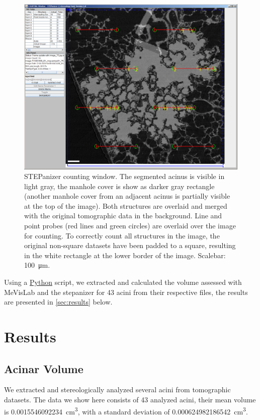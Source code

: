 \documentclass[twoside,paper=a4,abstract=true,english,DIVcalc]{scrartcl}
\newcommand{\imsize}{\linewidth}
\newcommand{\numberofacini}{43}
\newcommand{\volume}{0.0015546092234} %
\newcommand{\std}{0.000624982186542} %
\begin{document}
\renewcommand{\imsize}{\linewidth}%
\begin{figure}
	\centering
	\includegraphics[width=\imsize]{img/STEPanizer_2010_R108C60B_acinus01_Slice75}
	\caption{STEPanizer counting window. The segmented acinus is visible in light gray, the manhole cover is show as darker gray rectangle (another manhole cover from an adjacent acinus is partially visible at the top of the image). Both structures are overlaid and merged with the original tomographic data in the background. Line and point probes (red lines and green circles) are overlaid over the image for counting. To correctly count all structures in the image, the original non-square datasets have been padded to a square, resulting in the white rectangle at the lower border of the image. Scalebar: \SI{100}{\micro\meter}.}
	\label{fig:STEPanizer}
\end{figure}

Using a \href{http://python.org/}{Python} script, we extracted and calculated the volume assessed with MeVisLab and the stepanizer for 43 acini from their respective files, the results are presented in \autoref{sec:results} below.

\section{Results}
\label{sec:results}
\subsection{Acinar Volume}
We extracted and stereologically analyzed several acini from tomographic datasets. The data we show here consists of \numberofacini\xspace analyzed acini, their mean volume is \SI{\volume}{\centi\metre\cubed}, with a standard deviation of \SI{\std}{\centi\metre\cubed}.
\end{document}
